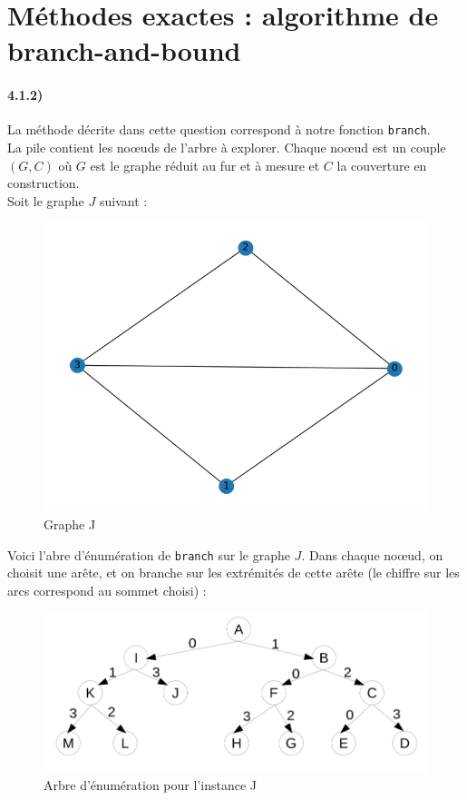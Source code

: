 \documentclass[12pt]{article}
\begin{document}
\section{Méthodes exactes : algorithme de branch-and-bound}

    \paragraph{4.1.2)}
        La méthode décrite dans cette question correspond à notre fonction \texttt{branch}. \\
        La pile contient les noœuds de l'arbre à explorer. Chaque noœud est un couple $(G,C)$ où $G$ est le graphe réduit au fur et à mesure et $C$ la couverture en construction. \\
        Soit le graphe $J$ suivant :

        \begin{figure}[H]
            \caption{Graphe J}
            \includegraphics[scale=0.5]{figures/Figure_1.png}
            \centering
        \end{figure}

        Voici l'abre d'énumération de \texttt{branch} sur le graphe $J$. Dans chaque noœud, on choisit une arête, et on branche sur les extrémités de cette arête (le chiffre sur les arcs correspond au sommet choisi) :

        \begin{figure}[H]
            \caption{Arbre d'énumération pour l'instance J}
            \includegraphics[scale=0.4]{figures/arbre_enum.png}
            \centering
        \end{figure}
\end{document}
